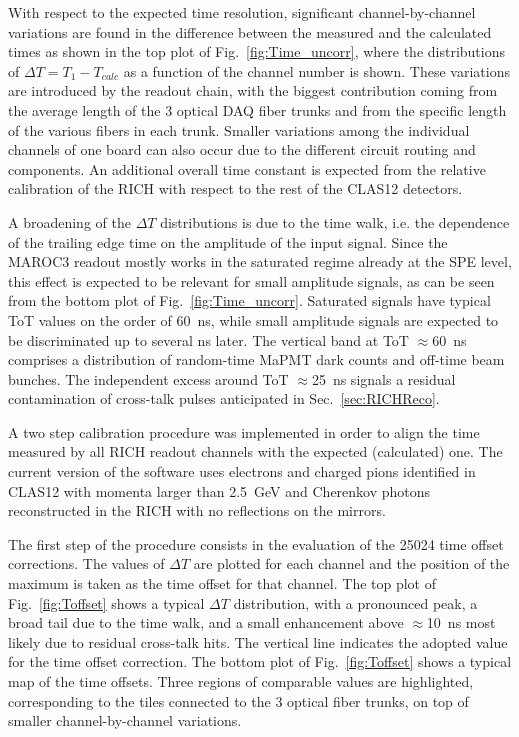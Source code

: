 \documentclass[5p,times,twocolumn]{elsarticle}
\def\MaPMT{MaPMT }
\begin{document}
With respect to the expected time resolution, significant channel-by-channel variations are found in the difference
between the measured and the calculated times as shown in the top plot of Fig.~\ref{fig:Time_uncorr}, where the
distributions of $\Delta T=T_1-T_{calc}$ as a function of the channel number is shown. These variations are introduced
by the readout chain, with the biggest contribution coming from the average length of the 3 optical DAQ fiber trunks and
from the specific length of the various fibers in each trunk. Smaller variations among the individual channels of one
board can also occur due to the different circuit routing and components. An additional overall time constant is
expected from the relative calibration of the RICH with respect to the rest of the CLAS12 detectors.

A broadening of the $\Delta T$ distributions is due to the time walk, i.e. the dependence of the trailing edge time
on the amplitude of the input signal. Since the MAROC3 readout mostly works in the saturated regime already
at the SPE level, this effect is expected to be relevant for small amplitude signals, as can be seen from the bottom
plot of Fig.~\ref{fig:Time_uncorr}. Saturated signals have typical ToT values on the order of 60~ns, while small
amplitude signals are expected to be discriminated up to several ns later. The vertical band at ToT $\approx$60~ns
comprises a distribution of random-time \MaPMT dark counts and off-time beam bunches. The independent excess
around ToT $\approx$25~ns signals a residual contamination of cross-talk pulses anticipated in Sec.~\ref{sec:RICHReco}.



A two step calibration procedure was implemented in order to align the time measured by all RICH readout
channels with the expected (calculated) one. The current version of the software uses electrons and charged pions
identified in CLAS12 with momenta larger than 2.5~GeV and Cherenkov photons reconstructed in the RICH with
no reflections on the mirrors.

The first step of the procedure consists in the evaluation of the 25024 time offset corrections. The values of
$\Delta T$ are plotted for each channel and the position of the maximum is taken as the time offset for that
channel. The top plot of Fig.~\ref{fig:Toffset} shows a typical $\Delta T$ distribution, with a pronounced peak, a
broad tail due to the time walk, and a small enhancement above $\approx$10~ns most likely due to residual cross-talk
hits. The vertical line indicates the adopted value for the time offset correction. The bottom plot of
Fig.~\ref{fig:Toffset} shows a typical map of the time offsets. Three regions of comparable values are highlighted,
corresponding to the tiles connected to the 3 optical fiber trunks, on top of smaller channel-by-channel variations.
\end{document}
